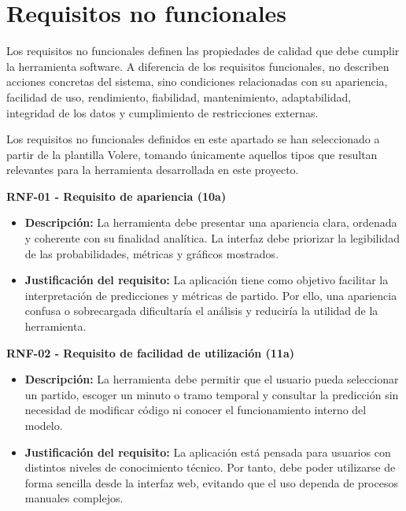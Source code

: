 \section{Requisitos no funcionales}

Los requisitos no funcionales definen las propiedades de calidad que debe cumplir la herramienta software. A diferencia de los requisitos funcionales, no describen acciones concretas del sistema, sino condiciones relacionadas con su apariencia, facilidad de uso, rendimiento, fiabilidad, mantenimiento, adaptabilidad, integridad de los datos y cumplimiento de restricciones externas.

Los requisitos no funcionales definidos en este apartado se han seleccionado a partir de la plantilla Volere, tomando únicamente aquellos tipos que resultan relevantes para la herramienta desarrollada en este proyecto. \cite{robertson2006volere}

\textbf{RNF-01 - Requisito de apariencia (10a)}

\begin{itemize}
    \item \textbf{Descripción:} La herramienta debe presentar una apariencia clara, ordenada y coherente con su finalidad analítica. La interfaz debe priorizar la legibilidad de las probabilidades, métricas y gráficos mostrados.
    \item \textbf{Justificación del requisito:} La aplicación tiene como objetivo facilitar la interpretación de predicciones y métricas de partido. Por ello, una apariencia confusa o sobrecargada dificultaría el análisis y reduciría la utilidad de la herramienta.
\end{itemize}

\textbf{RNF-02 - Requisito de facilidad de utilización (11a)}

\begin{itemize}
    \item \textbf{Descripción:} La herramienta debe permitir que el usuario pueda seleccionar un partido, escoger un minuto o tramo temporal y consultar la predicción sin necesidad de modificar código ni conocer el funcionamiento interno del modelo.
    \item \textbf{Justificación del requisito:} La aplicación está pensada para usuarios con distintos niveles de conocimiento técnico. Por tanto, debe poder utilizarse de forma sencilla desde la interfaz web, evitando que el uso dependa de procesos manuales complejos.
\end{itemize}

